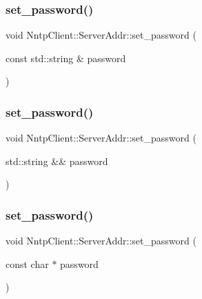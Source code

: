 \hypertarget{class_nntp_client_1_1_server_addr_a95a3912a9c287c3dbb06ca4476dac993}{}\label{class_nntp_client_1_1_server_addr_a95a3912a9c287c3dbb06ca4476dac993} 
\subsubsection{\texorpdfstring{set\+\_\+password()}{set\_password()}\hspace{0.1cm}{\footnotesize\ttfamily [1/3]}}
{\footnotesize\ttfamily void Nntp\+Client\+::\+Server\+Addr\+::set\+\_\+password (\begin{DoxyParamCaption}\item[{const std\+::string \&}]{password }\end{DoxyParamCaption})\hspace{0.3cm}{\ttfamily [inline]}}

\hypertarget{class_nntp_client_1_1_server_addr_a8abc70e426256440b6188d89b7b65db7}{}\label{class_nntp_client_1_1_server_addr_a8abc70e426256440b6188d89b7b65db7} 
\subsubsection{\texorpdfstring{set\+\_\+password()}{set\_password()}\hspace{0.1cm}{\footnotesize\ttfamily [2/3]}}
{\footnotesize\ttfamily void Nntp\+Client\+::\+Server\+Addr\+::set\+\_\+password (\begin{DoxyParamCaption}\item[{std\+::string \&\&}]{password }\end{DoxyParamCaption})\hspace{0.3cm}{\ttfamily [inline]}}

\hypertarget{class_nntp_client_1_1_server_addr_a89d3bec4ac2e5ed0e9acdcf07de34fd6}{}\label{class_nntp_client_1_1_server_addr_a89d3bec4ac2e5ed0e9acdcf07de34fd6} 
\subsubsection{\texorpdfstring{set\+\_\+password()}{set\_password()}\hspace{0.1cm}{\footnotesize\ttfamily [3/3]}}
{\footnotesize\ttfamily void Nntp\+Client\+::\+Server\+Addr\+::set\+\_\+password (\begin{DoxyParamCaption}\item[{const char $\ast$}]{password }\end{DoxyParamCaption})\hspace{0.3cm}{\ttfamily [inline]}}

